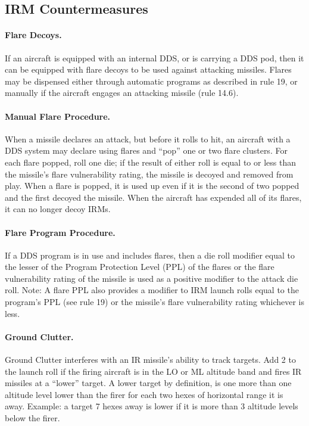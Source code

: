 \subsection{IRM Countermeasures}

\paragraph{Flare Decoys.} If an aircraft is equipped with an internal DDS, or is carrying a DDS pod, then it can be equipped with flare decoys to be used against attacking missiles. Flares may be dispensed either through automatic programs as described in rule 19, or manually if the aircraft engages an attacking missile (rule 14.6).

\paragraph{Manual Flare Procedure.} When a missile declares an attack, but before it rolls to hit, an aircraft with a DDS system may declare using flares and “pop” one or two flare clusters. For each flare popped, roll one die; if the result of either roll is equal to or less than the missile's flare vulnerability rating, the missile is decoyed and removed from play. When a flare is popped, it is used up even if it is the second of two popped and the first decoyed the missile. When the aircraft has expended all of its flares, it can no longer decoy IRMs.

\paragraph{Flare Program Procedure.} If a DDS program is in use and includes flares, then a die roll modifier equal to the lesser of the Program Protection Level (PPL) of the flares or the flare vulnerability rating of the missile is used as a positive modifier to the attack die roll. Note: A flare PPL also provides a modifier to IRM launch rolls equal to the program's PPL (see rule 19) or the missile's flare vulnerability rating whichever is less.

\paragraph{Ground Clutter.} Ground Clutter interferes with an IR missile's ability to track targets. Add 2 to the launch roll if the firing aircraft is in the LO or ML altitude band and fires IR missiles at a “lower” target. A lower target by definition, is one more than one altitude level lower than the firer for each two hexes of horizontal range it is away. Example: a target 7 hexes away is lower if it is more than 3 altitude levels below the firer.

